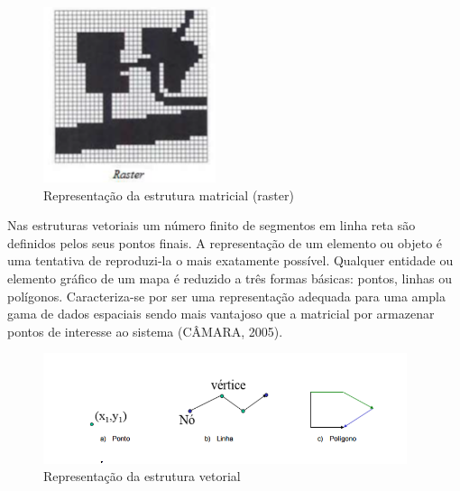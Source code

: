 \documentclass[
	12pt,				%
    oneside,			%
	a4paper,			%
	english,			%
	french,				%
	spanish,			%
	brazil,				%
	]{abntex2}
\begin{document}
\begin{figure} [hbt] 
\label{figura1} 
\caption{Representação da estrutura matricial (raster)}
\includegraphics[width=0.45\textwidth]{raster.png} %
\end{figure}

Nas estruturas vetoriais um número finito de segmentos em linha reta são definidos pelos seus pontos finais. A representação de um elemento ou objeto é uma tentativa de reproduzi-la o mais exatamente possível. Qualquer entidade ou elemento gráfico de um mapa é reduzido a três formas básicas: pontos, linhas ou polígonos. Caracteriza-se por ser uma representação adequada para uma ampla gama de dados espaciais sendo mais vantajoso que a matricial por armazenar pontos de interesse ao sistema (CÂMARA, 2005).

\begin{figure} [hbt] 
\label{figura1} 
\caption{Representação da estrutura vetorial}
\includegraphics[width=0.95\textwidth]{vetorial.png} %
\end{figure}
\end{document}
